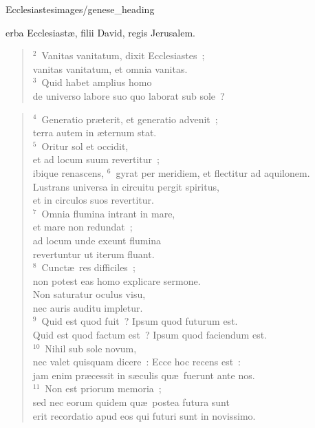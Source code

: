 {Ecclesiastes}{images/genese_heading}


\bchapter
{}erba Ecclesiast\ae , filii David, regis Jerusalem.
\begin{verse}\vspace{6pt}${}^{2}$~Vanitas vanitatum, dixit Ecclesiastes~;\\ vanitas vanitatum, et omnia vanitas.\\
${}^{3}$~Quid habet amplius homo\\ de universo labore suo quo laborat sub sole~?\end{verse}


\begin{verse}${}^{4}$~Generatio pr\ae terit, et generatio advenit~;\\ terra autem in \ae ternum stat.\\
${}^{5}$~Oritur sol et occidit,\\ et ad locum suum revertitur~;\\ ibique renascens,
${}^{6}$~gyrat per meridiem, et flectitur ad aquilonem.\\ Lustrans universa in circuitu pergit spiritus,\\ et in circulos suos revertitur.\\
${}^{7}$~Omnia flumina intrant in mare,\\ et mare non redundat~;\\ ad locum unde exeunt flumina\\ revertuntur ut iterum fluant.\\
${}^{8}$~Cunct\ae\ res difficiles~;\\ non potest eas homo explicare sermone.\\ Non saturatur oculus visu,\\ nec auris auditu impletur.\\
${}^{9}$~Quid est quod fuit~? Ipsum quod futurum est.\\ Quid est quod factum est~? Ipsum quod faciendum est.\\
${}^{10}$~Nihil sub sole novum,\\ nec valet quisquam dicere~: Ecce hoc recens est~:\\ jam enim pr\ae cessit in s\ae culis qu\ae\ fuerunt ante nos.\\
${}^{11}$~Non est priorum memoria~;\\ sed nec eorum quidem qu\ae\ postea futura sunt\\ erit recordatio apud eos qui futuri sunt in novissimo.\end{verse}


